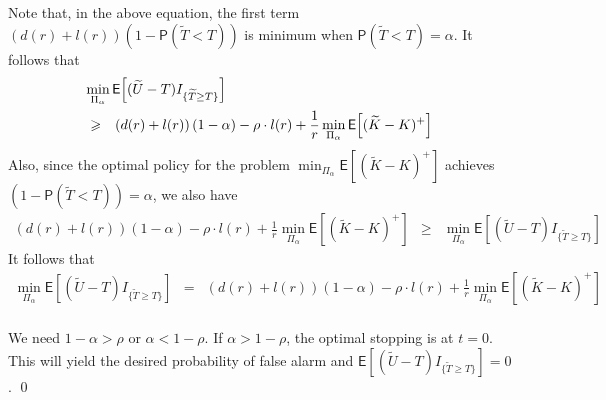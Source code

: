 \documentclass[acmtosn]{acmtrans2m}
\newcommand{\EXP}[1]{\mathsf{E}\!\left[#1\right]}
\begin{document}
Note that, in the above equation, the first term
$\left(d(r)+l(r)\right)\left(1 - {\mathsf P}\left(\widetilde{T} <
    T\right)\right)$ is minimum when ${\mathsf P}\left(\widetilde{T} <
  T\right) = \alpha$.
It follows that
\begin{eqnarray*}
\lefteqn{\min_{\Pi_\alpha} \EXP{(\widetilde{U}-T) I_{\{\widetilde{T}\ge T\}}}} \\
& \geqslant & \left(d(r)+l(r)\right)\left(1 - \alpha \right) - \rho\cdot l(r) 
+ \frac{1}{r}\min_{\Pi_\alpha}\EXP{(\widetilde{K}-K)^+}  \\
\end{eqnarray*}
Also, since the optimal policy for the problem
$\min_{\Pi_\alpha}\EXP{(\widetilde{K}-K)^+} $ achieves  $\left(1 -
  {\mathsf P}\left(\widetilde{T} < T\right)\right) = \alpha$, we also have 
\begin{eqnarray*}
  \left(d(r)+l(r)\right)\left(1 - \alpha \right) - \rho\cdot l(r) 
  + \frac{1}{r}\min_{\Pi_\alpha}\EXP{(\widetilde{K}-K)^+} &\geqslant& 
  \min_{\Pi_\alpha} \EXP{(\widetilde{U}-T) I_{\{\widetilde{T}\ge T\}}} 
\end{eqnarray*}
It follows that
\begin{eqnarray*}
\min_{\Pi_\alpha} \EXP{(\widetilde{U}-T) I_{\{\widetilde{T}\ge T\}}}
& = & \left(d(r)+l(r)\right)\left(1 - \alpha \right) - \rho\cdot l(r) 
+ \frac{1}{r}\min_{\Pi_\alpha}\EXP{(\widetilde{K}-K)^+}  \\
\end{eqnarray*}

We need $1 - \alpha > \rho$ or $\alpha < 1 - \rho$.
If $\alpha > 1 - \rho$, the optimal stopping is at $t = 0$. 
This will yield the desired probability of false alarm and 
$\EXP{(\widetilde{U}-T) I_{\{\widetilde{T}\ge T\}}} = 0$.
\qed
\end{document}
